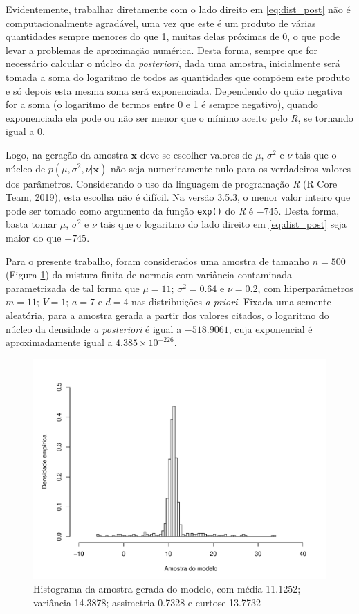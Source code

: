Evidentemente, trabalhar diretamente com o lado direito em \eqref{eq:dist_post} não é computacionalmente agradável, uma vez que este é um produto de várias quantidades sempre menores do que 1, muitas delas próximas de 0, o que pode levar a problemas de aproximação numérica. Desta forma, sempre que for necessário calcular o núcleo da \textit{posteriori}, dada uma amostra, inicialmente será tomada a soma do logaritmo de todos as quantidades que compõem este produto e só depois esta mesma soma será exponenciada. Dependendo do quão negativa for a soma (o logaritmo de termos entre 0 e 1 é sempre negativo), quando exponenciada ela pode ou não ser menor que o mínimo aceito pelo \textit{R}, se tornando igual a 0.

Logo, na geração da amostra $\bm{x}$ deve-se escolher valores de $\mu$, $\sigma^2$ e $\nu$ tais que o núcleo de $p(\mu, \sigma^2, \nu | \bm{x})$ não seja numericamente nulo para os verdadeiros valores dos parâmetros. Considerando o uso da linguagem de programação \textit{R} (R Core Team, 2019)\cite{RCoreTeam2019}, esta escolha não é difícil. Na versão 3.5.3, o menor valor inteiro que pode ser tomado como argumento da função \verb|exp()| do \textit{R} é $-745$. Desta forma, basta tomar $\mu$, $\sigma^2$ e $\nu$ tais que o logaritmo do lado direito em \eqref{eq:dist_post} seja maior do que $-745$.

Para o presente trabalho, foram considerados uma amostra de tamanho $n=500$ (Figura \ref{fig:sample_n}) da mistura finita de normais com variância contaminada parametrizada de tal forma que $\mu = 11$; $\sigma^2 = 0.64$ e $\nu = 0.2$, com hiperparâmetros $m = 11$; $V = 1$; $a = 7$ e $d = 4$ nas distribuições \textit{a priori}. Fixada uma semente aleatória, para a amostra gerada a partir dos valores citados, o logaritmo do núcleo da densidade \textit{a posteriori} é igual a $-518.9061$, cuja exponencial é aproximadamente igual a $4.385 \times 10^{-226}$.

\begin{figure}[htb]
	\centering
	\includegraphics[scale=0.8]{figuras/amostra_n.pdf}
	\caption{Histograma da amostra gerada do modelo, com média 11.1252; variância 14.3878; assimetria 0.7328 e curtose 13.7732}
	\label{fig:sample_n}
\end{figure}

